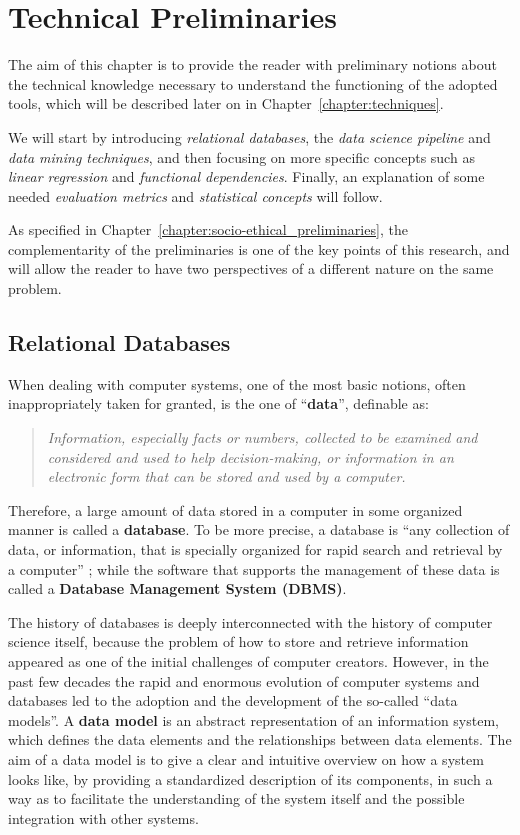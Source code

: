 \chapter{Technical Preliminaries}
\label{chapter:technical_preliminaries}
\thispagestyle{empty}

The aim of this chapter is to provide the reader with preliminary notions about the technical knowledge necessary to understand the functioning of the adopted tools, which will be described later on in Chapter~\ref{chapter:techniques}.

We will start by introducing \textit{relational databases}, the \textit{data science pipeline} and \textit{data mining techniques}, and then focusing on more specific concepts such as \textit{linear regression} and \textit{functional dependencies}. Finally, an explanation of some needed \textit{evaluation metrics} and \textit{statistical concepts} will follow.

As specified in Chapter~\ref{chapter:socio-ethical_preliminaries}, the complementarity of the preliminaries is one of the key points of this research, and will allow the reader to have two perspectives of a different nature on the same problem.


\section{Relational Databases}
\label{section:relational_databases}
When dealing with computer systems, one of the most basic notions, often inappropriately taken for granted, is the one of ``\textbf{data}'', definable as:
\begin{quote}\emph{Information, especially facts or numbers, collected to be examined and considered and used to help decision-making, or information in an electronic form that can be stored and used by a computer.} \cite{cambridge2013data}\end{quote}
Therefore, a large amount of data stored in a computer in some organized manner is called a \textbf{database}. To be more precise, a database is ``any collection of data, or information, that is specially organized for rapid search and retrieval by a computer'' \cite{britannica2020database}; while the software that supports the management of these data is called a \textbf{Database Management System (DBMS)}.

The history of databases is deeply interconnected with the history of computer science itself, because the problem of how to store and retrieve information appeared as one of the initial challenges of computer creators. However, in the past few decades the rapid and enormous evolution of computer systems and databases led to the adoption and the development of the so-called ``data models''. A \textbf{data model} \cite{abiteboul1995foundations} is an abstract representation of an information system, which defines the data elements and the relationships between data elements. The aim of a data model is to give a clear and intuitive overview on how a system looks like, by providing a standardized description of its components, in such a way as to facilitate the understanding of the system itself and the possible integration with other systems.

